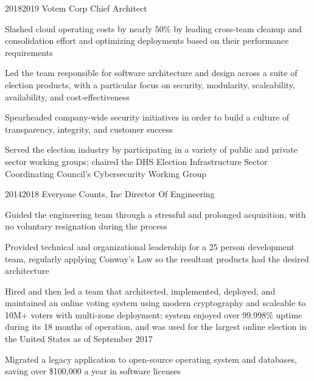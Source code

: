 \documentclass{article}
\begin{document}
\job
  {2018}{2019}
  {Votem Corp}
  {Chief Architect}
  {\begin{achievements}
    \item Slashed cloud operating costs by nearly 50\% by leading cross-team cleanup and consolidation effort and optimizing deployments based on their performance requirements
    \item Led the team responsible for software architecture and design across a suite of election products, with a particular focus on security, modularity, scaleability, availability, and cost-effectiveness
    \item Spearheaded company-wide security initiatives in order to build a culture of transparency, integrity, and customer success
    \item Served the election industry by participating in a variety of public and private sector working groups; chaired the DHS Election Infrastructure Sector Coordinating Council's Cybersecurity Working Group
  \end{achievements}}

\pagebreak

\job
  {2014}{2018}
  {Everyone Counts, Inc}
  {Director Of Engineering}
  {\begin{achievements}
    \item Guided the engineering team through a stressful and prolonged acquisition, with no voluntary resignation during the process
    \item Provided technical and organizational leadership for a 25 person development team, regularly applying Conway's Law so the resultant products had the desired architecture
    \item Hired and then led a team that architected, implemented, deployed, and maintained an online voting system using modern cryptography and scaleable to 10M+ voters with multi-zone deployment; system enjoyed over 99.998\% uptime during its 18 months of operation, and was used for the largest online election in the United States as of September 2017
    \item Migrated a legacy application to open-source operating system and databases, saving over \$100,000 a year in software licenses
  \end{achievements}}
\end{document}
